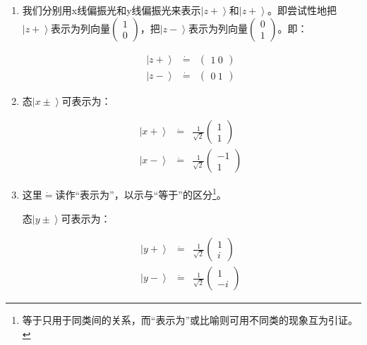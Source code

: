 \begin{enumerate}
\item 

我们分别用x线偏振光和y线偏振光来表示$\left| z+ \right\rangle$和$\left| z+ \right\rangle$。即尝试性地把$\left| z+ \right\rangle$表示为列向量$\left( \begin{array}{ccc} 1 \\ 0   \end{array} \right)$，把$\left| z- \right\rangle$表示为列向量$\left( \begin{array}{ccc} 0 \\ 1 \end{array} \right)$。即：

\begin{align}
\left| z+ \right\rangle & \dot = & \left( \begin{array}{ccc} 1 \ 0   \end{array} \right)~\\
\left| z- \right\rangle & \dot = & \left( \begin{array}{ccc} 0 \ 1 \end{array} \right)~
\end{align}

\item

态$\left| x \pm \right\rangle$可表示为：

\begin{align}
\left| x + \right\rangle & \dot = & \frac{1}{\sqrt{2}}  \left( \begin{array}{ccc}  1 \\ 1 \end{array}  \right)~ \\
\left| x - \right\rangle  & \dot =  & \frac{1}{\sqrt{2}}  \left( \begin{array}{ccc}  -1 \\ 1 \end{array} \right)~
\end{align}

\item
这里$\dot =$读作“表示为”，以示与“等于”的区分\footnote{等于只用于同类间的关系，而“表示为”或比喻则可用不同类的现象互为引证。}。

态$\left| y \pm \right\rangle$可表示为：

\begin{align}
\left| y + \right\rangle & \dot = & \frac{1}{\sqrt{2}} \left( \begin{array}{ccc}  1 \\ i  \end{array} \right)~ \\
\left| y - \right\rangle  & \dot =  & \frac{1}{\sqrt{2}} \left( \begin{array}{ccc}  1 \\ -i \end{array} \right)~
\end{align}

\end{enumerate}

